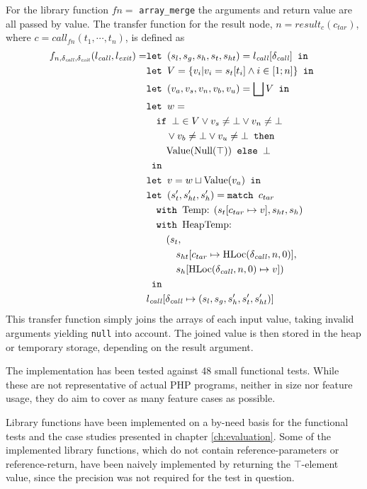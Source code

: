 For the library function $fn = $ \texttt{array\_merge} the arguments and return value are all passed by value. The transfer function for the result node, $n = \mathit{result}_{c}(c_{\mathit{tar}})$, where $c = \mathit{call}_{{fn}}(t_1,\cdots, t_n)$, is defined as 
\begin{align*}
f_{n,\delta_{\mathit{call}},\delta_{\mathit{exit}}}(l_{\mathit{call}}, l_{\mathit{exit}}) = 	&\texttt{let } (s_l, s_g, s_h, s_t, s_{ht}) = l_{\mathit{call}}[\delta_{\mathit{call}}] \texttt{ in }\notag\\
																							&\texttt{let } V =  \{v_i| v_i = s_t[t_i]\wedge i \in [1;n]\} \texttt{ in }\notag\\
																							&\texttt{let } (v_a,v_s, v_n, v_b, v_u) = \bigsqcup V \texttt{ in }\notag\\
																							&\texttt{let } w =  \notag\\
																							&\quad\texttt{if }\bot \in V \vee v_s \neq \bot \vee v_n \neq \bot\notag\\
																							&\quad\quad \vee v_b \neq \bot \vee v_u \neq \bot\texttt{ then } \notag\\
																							&\quad\quad\text{Value}(\text{Null}(\top)) \texttt{ else } \bot\notag\\
																							& \texttt{ in }\notag\\
																							&\texttt{let } v = w \sqcup \text{Value}(v_a) \texttt{ in }\notag\\
																							&\texttt{let } (s_t', s_{ht}',s_h') = \texttt{match }c_{tar}\notag\\
																							&\quad\texttt{with }\text{Temp}\text{: } (s_t[c_{tar}\mapsto v], s_{ht}, s_h)\notag\\
																							&\quad\texttt{with }\text{HeapTemp}\text{: }\notag\\
																							&\quad\quad(s_t, \notag\\
																							&\quad\quad\quad s_{ht}[c_{tar}\mapsto \text{HLoc}(\delta_{\mathit{call}}, n, 0)], \notag\\
																							&\quad\quad\quad s_h[\text{HLoc}(\delta_{\mathit{call}}, n, 0)\mapsto v])\notag\\
																							& \texttt{ in }\notag\\
																							&l_{\mathit{call}}[\delta_{\mathit{call}}\mapsto (s_l, s_g, s_h', s_t', s_{ht}')]
\end{align*} 
This transfer function simply joins the arrays of each input value, taking invalid arguments yielding \texttt{null} into account. The joined value is then stored in the heap or temporary storage, depending on the result argument.

The implementation has been tested against 48 small functional tests. While these are not representative of actual PHP programs, neither in size nor feature usage, they do aim to cover as many feature cases as possible.

Library functions have been implemented on a by-need basis for the functional tests and the case studies presented in chapter \ref{ch:evaluation}. Some of the implemented library functions, which do not contain reference-parameters or reference-return, have been naively implemented by returning the $\top$-element value, since the precision was not required for the test in question.
